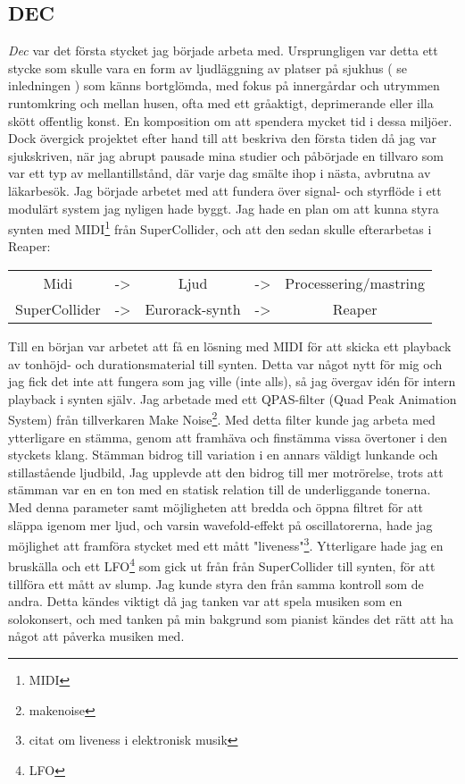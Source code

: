 \documentclass{article}
\begin{document}
	\subsection{DEC}
	\emph{Dec} var det första stycket jag började arbeta med. Ursprungligen var detta ett stycke som skulle
	vara en form av ljudläggning av platser på sjukhus ( se inledningen ) som känns bortglömda, med fokus på
	innergårdar och utrymmen runtomkring och mellan husen, ofta med ett gråaktigt, deprimerande eller illa
	skött offentlig konst. En komposition om att spendera mycket tid i dessa miljöer. Dock övergick projektet
	efter hand till att beskriva den första tiden då jag var sjukskriven, när jag abrupt pausade mina studier
	och påbörjade en tillvaro som var ett typ av mellantillstånd, där varje dag smälte ihop i nästa, avbrutna
	av läkarbesök.
		Jag började arbetet med att fundera över signal- och styrflöde i ett modulärt system jag nyligen hade
		byggt. Jag hade en plan om att kunna styra synten med MIDI\footnote{MIDI} från SuperCollider, och att
		den sedan skulle efterarbetas i Reaper:
		\begin{center}
			\begin{tabular}{ c c c c c }
				Midi		  & -> & Ljud			& -> & Processering/mastring \\
				SuperCollider & -> & Eurorack-synth & -> & Reaper
			\end{tabular}
		\end{center}

		Till en början var arbetet att få en lösning med MIDI för att skicka ett playback av tonhöjd- och
		durationsmaterial till synten. Detta var något nytt för mig och jag fick det inte att fungera som jag
		ville (inte alls), så jag övergav idén för intern playback i synten själv. 
		Jag arbetade med ett QPAS-filter (Quad Peak Animation System) från tillverkaren Make
		Noise\footnote{makenoise}. Med detta filter kunde jag arbeta med ytterligare en stämma, genom att
		framhäva och finstämma vissa övertoner i den styckets klang. Stämman bidrog till variation i en
		annars väldigt lunkande och stillastående ljudbild, Jag upplevde att den bidrog till mer motrörelse,
		trots att stämman var en en ton med en statisk relation till de underliggande tonerna. Med denna
		parameter samt möjligheten att bredda och öppna filtret för att släppa igenom mer ljud, och varsin
		wavefold-effekt på oscillatorerna, hade jag möjlighet att framföra stycket med ett mått
		"liveness"\footnote{citat om liveness i elektronisk musik}. Ytterligare hade jag en bruskälla och ett
		LFO\footnote{LFO} som gick ut från från SuperCollider till synten, för att tillföra ett mått av slump.
		Jag kunde styra den från samma kontroll som de andra. Detta kändes viktigt då jag tanken var att
		spela musiken som en solokonsert, och med tanken på min bakgrund som pianist kändes det rätt att ha
		något att påverka musiken med. 
\end{document}
